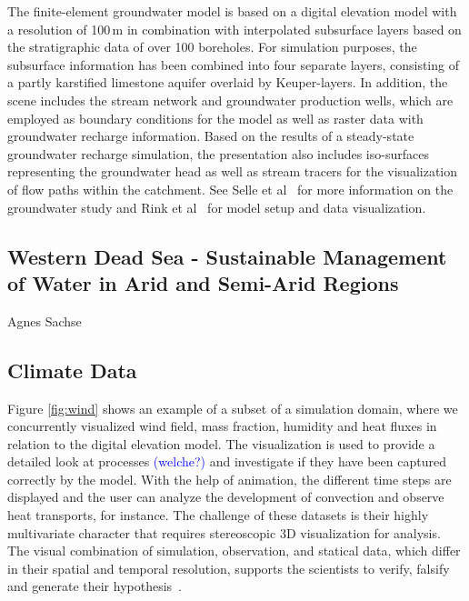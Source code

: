 \documentclass[twocolumn]{svjour3}          %
\newcommand{\myedit}[2]{\textcolor{red}{\st{#1}} \textcolor{blue}{#2}}
\begin{document}
The finite-element groundwater model is based on a digital elevation model with a resolution of 100\,m in combination with interpolated subsurface layers based on the stratigraphic data of over 100 boreholes. For simulation purposes, the subsurface information has been combined into four separate layers, consisting of a partly karstified limestone aquifer overlaid by Keuper-layers. In addition, the scene includes the stream network and groundwater production wells, which are employed as boundary conditions for the model as well as raster data with groundwater recharge information. Based on the results of a steady-state groundwater recharge simulation, the presentation also includes iso-surfaces representing the groundwater head as well as stream tracers for the visualization of flow paths within the catchment. See Selle et al~\cite{selle:wessti} for more information on the groundwater study and Rink et al~\cite{rink:wessti} for model setup and data visualization.

\subsection{Western Dead Sea - Sustainable Management of Water in Arid and Semi-Arid
Regions}
\label{western-dead-sea---sustainable-management-of-water-in-arid-and-semi-arid-regions}

Agnes Sachse \cite{graebe:modelcare}

\subsection{Climate Data}
\label{climate-data}

Figure \ref{fig:wind} shows an example of a subset of a simulation domain, where we concurrently visualized wind field, mass fraction, humidity and heat fluxes in relation to the digital elevation model. The visualization is used to provide a detailed look at processes \myedit{}{(welche?)} and investigate if they have been captured correctly by the model. With the help of animation, the different time steps are displayed and the user can analyze the development of convection and observe heat transports, for instance. The challenge of these datasets is their highly multivariate character that requires stereoscopic 3D visualization for analysis. The visual combination of simulation, observation, and statical data, which differ in their spatial and temporal resolution, supports the scientists to verify, falsify and generate their hypothesis~\cite{helbig:eesenvirvis}.
\end{document}
